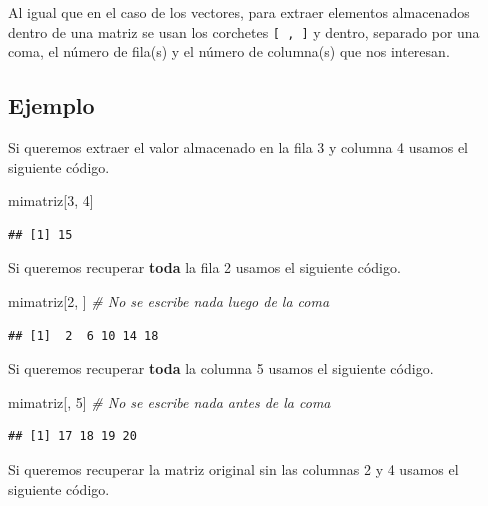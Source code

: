 \documentclass[10pt,]{krantz}
\makeatletter
\newenvironment{Shaded}{\begin{snugshade}}{\end{snugshade}}
\newcommand{\DecValTok}[1]{\textcolor[rgb]{0.00,0.00,0.81}{{#1}}}
\newcommand{\CommentTok}[1]{\textcolor[rgb]{0.56,0.35,0.01}{\textit{{#1}}}}
\newcommand{\NormalTok}[1]{{#1}}
\newenvironment{kframe}{%
\medskip{}
\setlength{\fboxsep}{.8em}
 \def\at@end@of@kframe{}%
 \ifinner\ifhmode%
  \def\at@end@of@kframe{\end{minipage}}%
  \begin{minipage}{\columnwidth}%
 \fi\fi%
 \def\FrameCommand##1{\hskip\@totalleftmargin \hskip-\fboxsep
 \colorbox{shadecolor}{##1}\hskip-\fboxsep
     \hskip-\linewidth \hskip-\@totalleftmargin \hskip\columnwidth}%
 \MakeFramed {\advance\hsize-\width
   \@totalleftmargin\z@ \linewidth\hsize
   \@setminipage}}%
 {\par\unskip\endMakeFramed%
 \at@end@of@kframe}
\renewenvironment{Shaded}{\begin{kframe}}{\end{kframe}}
\makeatother
\begin{document}
Al igual que en el caso de los vectores, para extraer elementos
almacenados dentro de una matriz se usan los corchetes
\texttt{{[}\ ,\ {]}} y dentro, separado por una coma, el número de
fila(s) y el número de columna(s) que nos interesan.

\subsection*{Ejemplo}\label{ejemplo-1}


Si queremos extraer el valor almacenado en la fila 3 y columna 4 usamos
el siguiente código.

\begin{Shaded}
\begin{Highlighting}[]
\NormalTok{mimatriz[}\DecValTok{3}\NormalTok{, }\DecValTok{4}\NormalTok{]}
\end{Highlighting}
\end{Shaded}

\begin{verbatim}
## [1] 15
\end{verbatim}

Si queremos recuperar \textbf{toda} la fila 2 usamos el siguiente
código.

\begin{Shaded}
\begin{Highlighting}[]
\NormalTok{mimatriz[}\DecValTok{2}\NormalTok{, ]  }\CommentTok{# No se escribe nada luego de la coma}
\end{Highlighting}
\end{Shaded}

\begin{verbatim}
## [1]  2  6 10 14 18
\end{verbatim}

Si queremos recuperar \textbf{toda} la columna 5 usamos el siguiente
código.

\begin{Shaded}
\begin{Highlighting}[]
\NormalTok{mimatriz[, }\DecValTok{5}\NormalTok{]  }\CommentTok{# No se escribe nada antes de la coma}
\end{Highlighting}
\end{Shaded}

\begin{verbatim}
## [1] 17 18 19 20
\end{verbatim}

Si queremos recuperar la matriz original sin las columnas 2 y 4 usamos
el siguiente código.
\end{document}
